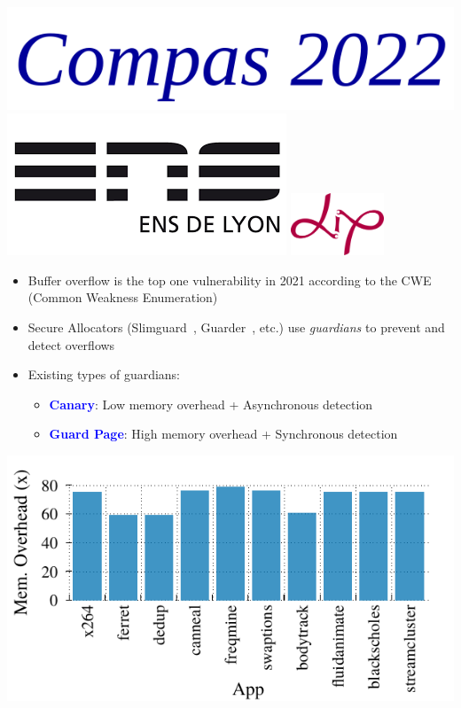 \documentclass[landscape,a0paper,fontscale=0.3]{baposter} %
\begin{document}
\begin{poster}
{\includegraphics[width=0.15\linewidth]{compas.png}
\hspace*{6.3em}
\includegraphics[scale=.2]{enslogo.png}}
{\includegraphics[height=5em]{logo_lip_HD.png}} 


{
    \begin{itemize}
        \item Buffer overflow is the top one vulnerability in 2021 according to the CWE (Common Weakness Enumeration)~\cite{top25}
        \item Secure Allocators (Slimguard~\cite{slimguard}, Guarder~\cite{guarder}, etc.) use \emph{guardians} to prevent and detect overflows
        \item Existing types of guardians: 
            \begin{itemize}
                \item \textcolor{blue}{\bf Canary}: Low memory overhead + Asynchronous detection
                \item \textcolor{blue}{\textbf{Guard Page}}: High memory overhead + Synchronous detection
            \end{itemize}
    \end{itemize}

    \centering
    \includegraphics[width=.4\columnwidth]{figures/waste1}
}



\end{poster}
\end{document}
